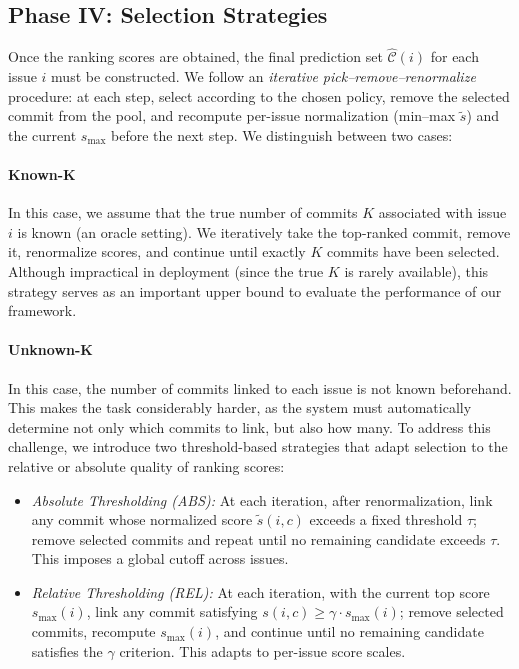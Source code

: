\subsection{Phase IV: Selection Strategies}
Once the ranking scores are obtained, the final prediction set $\widehat{\mathcal{C}}(i)$ for each issue $i$ must be constructed. We follow an \emph{iterative pick--remove--renormalize} procedure: at each step, select according to the chosen policy, remove the selected commit from the pool, and recompute per-issue normalization (min--max $\tilde{s}$) and the current $s_{\max}$ before the next step. We distinguish between two cases:  

\paragraph{Known-K} In this case, we assume that the true number of commits $K$ associated with issue $i$ is known (an oracle setting). We iteratively take the top-ranked commit, remove it, renormalize scores, and continue until exactly $K$ commits have been selected. Although impractical in deployment (since the true $K$ is rarely available), this strategy serves as an important upper bound to evaluate the performance of our framework. 

\paragraph{Unknown-K} In this case, the number of commits linked to each issue is not known beforehand. This makes the task considerably harder, as the system must automatically determine not only which commits to link, but also how many. To address this challenge, we introduce two threshold-based strategies that adapt selection to the relative or absolute quality of ranking scores:
\begin{itemize}
    \item \textit{Absolute Thresholding (ABS):} At each iteration, after renormalization, link any commit whose normalized score $\tilde{s}(i,c)$ exceeds a fixed threshold $\tau$; remove selected commits and repeat until no remaining candidate exceeds $\tau$. This imposes a global cutoff across issues.
    \item \textit{Relative Thresholding (REL):} At each iteration, with the current top score $s_{\max}(i)$, link any commit satisfying $s(i,c) \ge \gamma \cdot s_{\max}(i)$; remove selected commits, recompute $s_{\max}(i)$, and continue until no remaining candidate satisfies the $\gamma$ criterion. This adapts to per-issue score scales.
\end{itemize}

